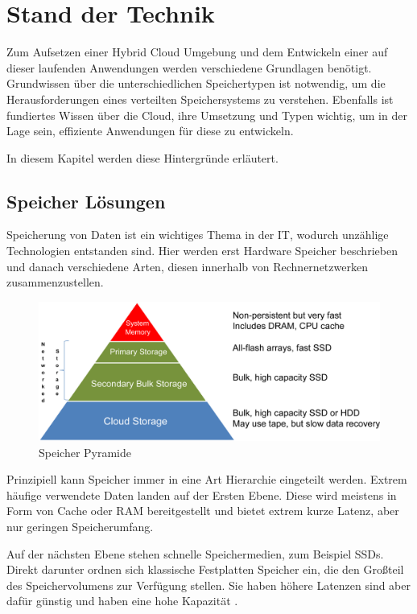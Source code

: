 \chapter{Stand der Technik}\label{ch:background}

Zum Aufsetzen einer Hybrid Cloud Umgebung und dem Entwickeln einer auf dieser laufenden Anwendungen werden verschiedene Grundlagen benötigt. Grundwissen über die unterschiedlichen Speichertypen ist notwendig, um die Herausforderungen eines verteilten Speichersystems zu verstehen. Ebenfalls ist fundiertes Wissen über die Cloud, ihre Umsetzung und Typen wichtig, um in der Lage sein, effiziente Anwendungen für diese zu entwickeln.

In diesem Kapitel werden diese Hintergründe erläutert.

\section{Speicher Lösungen}
Speicherung von Daten ist ein wichtiges Thema in der IT, wodurch unzählige Technologien entstanden sind. Hier werden erst Hardware Speicher beschrieben und danach verschiedene Arten, diesen innerhalb von Rechnernetzwerken zusammenzustellen.

\begin{figure}[hbt]
	\centering
	\includegraphics[scale=0.75]{images/storage-pyramide}
	\caption{Speicher Pyramide \parencite{kaufmann.2016}}
	\label{fig:storagepyramide}
\end{figure}

Prinzipiell kann Speicher immer in eine Art Hierarchie eingeteilt werden. Extrem häufige verwendete Daten landen auf der Ersten Ebene. Diese wird meistens in Form von Cache oder RAM bereitgestellt und bietet extrem kurze Latenz, aber nur geringen Speicherumfang.

Auf der nächsten Ebene stehen schnelle Speichermedien, zum Beispiel SSDs. Direkt darunter ordnen sich klassische Festplatten Speicher ein, die den Großteil des Speichervolumens zur Verfügung stellen. Sie haben höhere Latenzen sind aber dafür günstig und haben eine hohe Kapazität \parencite[Kap. 2, What is Computer Storage?]{kaufmann.2016}.

